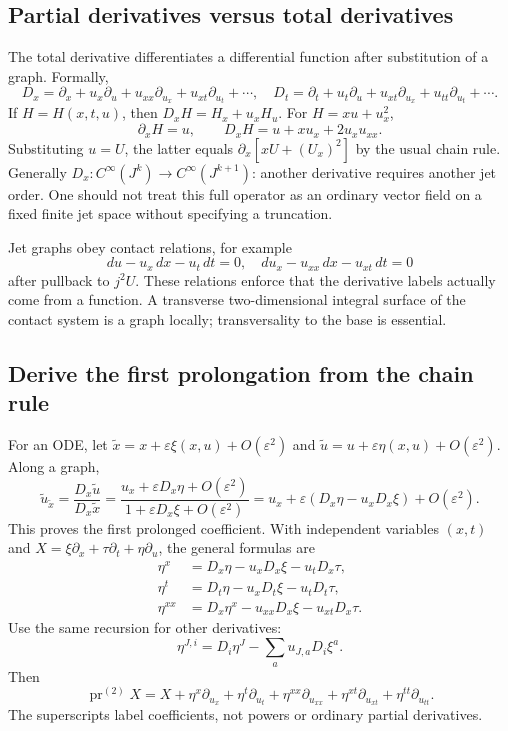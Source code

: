 \documentclass[11pt,a4paper]{article}
\numberwithin{equation}{section}
\theoremstyle{definition}
\theoremstyle{plain}
\theoremstyle{remark}
\newcommand{\pr}{\operatorname{pr}}
\begin{document}
\subsection{Partial derivatives versus total derivatives}\label{sec:total}
The total derivative differentiates a differential function after substitution of a graph. Formally,
\[
D_x=\partial_x+u_x\partial_u+u_{xx}\partial_{u_x}+u_{xt}\partial_{u_t}+\cdots,
\quad
D_t=\partial_t+u_t\partial_u+u_{xt}\partial_{u_x}+u_{tt}\partial_{u_t}+\cdots.
\]
If $H=H(x,t,u)$, then $D_xH=H_x+u_xH_u$. For $H=xu+u_x^2$,
\[
\partial_xH=u,\qquad D_xH=u+xu_x+2u_xu_{xx}.
\]
Substituting $u=U$, the latter equals $\partial_x[xU+(U_x)^2]$ by the usual chain rule. Generally $D_x:C^\infty(J^k)\to C^\infty(J^{k+1})$: another derivative requires another jet order. One should not treat this full operator as an ordinary vector field on a fixed finite jet space without specifying a truncation.

Jet graphs obey contact relations, for example
\[
du-u_x\,dx-u_t\,dt=0,
\quad du_x-u_{xx}\,dx-u_{xt}\,dt=0
\]
after pullback to $j^2U$. These relations enforce that the derivative labels actually come from a function. A transverse two-dimensional integral surface of the contact system is a graph locally; transversality to the base is essential.

\subsection{Derive the first prolongation from the chain rule}\label{sec:prolong}
For an ODE, let $\widetilde x=x+\varepsilon\xi(x,u)+O(\varepsilon^2)$ and $\widetilde u=u+\varepsilon\eta(x,u)+O(\varepsilon^2)$. Along a graph,
\[
\widetilde u_{\widetilde x}
=\frac{D_x\widetilde u}{D_x\widetilde x}
=\frac{u_x+\varepsilon D_x\eta+O(\varepsilon^2)}{1+\varepsilon D_x\xi+O(\varepsilon^2)}
=u_x+\varepsilon(D_x\eta-u_xD_x\xi)+O(\varepsilon^2).
\]
This proves the first prolonged coefficient. With independent variables $(x,t)$ and
$X=\xi\partial_x+\tau\partial_t+\eta\partial_u$, the general formulas are
\begin{align}
\eta^{x}&=D_x\eta-u_xD_x\xi-u_tD_x\tau,\label{eq:eta-x}\\
\eta^{t}&=D_t\eta-u_xD_t\xi-u_tD_t\tau,\label{eq:eta-t}\\
\eta^{xx}&=D_x\eta^{x}-u_{xx}D_x\xi-u_{xt}D_x\tau.\label{eq:eta-xx}
\end{align}
Use the same recursion for other derivatives:
\[
\eta^{J,i}=D_i\eta^J-\sum_a u_{J,a}D_i\xi^a.
\]
Then
\[
\pr^{(2)}X=X+\eta^x\partial_{u_x}+\eta^t\partial_{u_t}
+\eta^{xx}\partial_{u_{xx}}+\eta^{xt}\partial_{u_{xt}}+\eta^{tt}\partial_{u_{tt}}.
\]
The superscripts label coefficients, not powers or ordinary partial derivatives.
\end{document}

